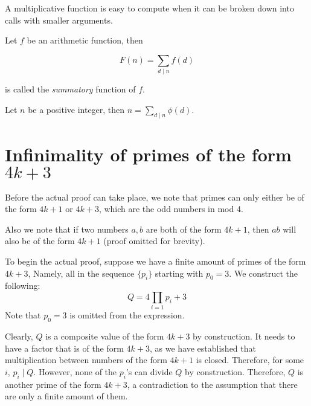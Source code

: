 \documentclass{article}
\begin{document}
\begin{multicols*}{2}
A multiplicative function is easy to compute when it can be broken down into calls with smaller arguments.

Let $f$ be an arithmetic function, then

\[F(n) = \sum_{d \mid n} f(d)\]

is called the  \textit{summatory} function of $f$.

Let $n$ be a positive integer, then $n = \sum_{d \mid n}\phi(d)$.



\newpage

\section{Infinimality of primes of the form $4k+3$}

Before the actual proof can take place, we note that primes can only either be of the form $4k+1$ or $4k+3$, which are the odd numbers in mod 4.

Also we note that if two numbers $a, b$ are both of the form $4k +1$, then $ab$ will also be of the form $4k + 1$ (proof omitted for brevity).

To begin the actual proof, suppose we have a finite amount of primes of the form $4k+3$, Namely, all in the sequence $\{p_i\}$ starting with $p_0 = 3$. We construct the following: \[Q = 4\prod_{i=1}{p_i} + 3\]Note that $p_0 = 3$ is omitted from the expression.

Clearly, $Q$ is a composite value of the form $4k+3$ by construction. It needs to have a factor that is of the form $4k+3$, as we have established that multiplication between numbers of the form $4k+1$ is closed. Therefore, for some $i$, $p_i \mid Q$. However, none of the $p_i$'s can divide $Q$ by construction. Therefore, $Q$ is another prime of the form $4k+3$, a contradiction to the assumption that there are only a finite amount of them.

\end{multicols*}
\end{document}
